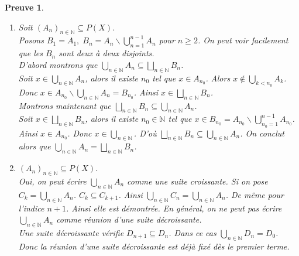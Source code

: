 \documentclass[a4paper, 12pt, french]{article}
\theoremstyle{break}
\newtheorem{preuve}{Preuve}[section]
\begin{document}
\begin{preuve}
      \begin{enumerate}
              \item Soit $(A_{n})_{n \in \mathbb{N}} \subseteq P(X)$.\\ Posons $ B_{1}= A_{1}, \; B_{n} = A_{n} \backslash \bigcup_{n=1}^{n-1} A_{n}$ pour $n \geq 2$. On peut voir facilement que les $B_{n}$ sont deux à deux disjoints.\\
              D'abord montrons que $\displaystyle\bigcup_{n \in \mathbb{N}} A_{n} \subseteq \bigsqcup_{n \in \mathbb{N}} B_{n}$.\\
              Soit $ x \in \displaystyle\bigcup_{n \in \mathbb{N}} A_{n}$, alors il existe $n_{0}$ tel que $x \in A_{n_{0}}$. Alors $x \not\in \displaystyle\bigcup_{k<n_{0}} A_{k}$. Donc $x \in A_{n_{0}} \backslash\displaystyle\bigcup_{n \in \mathbb{N}} A_{n} = B_{n_{0}}$.
              Ainsi $x \in \displaystyle\bigsqcup_{n \in \mathbb{N}} B_{n}$.\\
              Montrons maintenant que $\displaystyle\bigsqcup_{n \in \mathbb{N}} B_{n} \subseteq  \displaystyle\bigcup_{n \in \mathbb{N}} A_{n}$.\\
              Soit $x \in \bigsqcup_{n \in \mathbb{N}} B_{n}$, alors il existe $n_{0} \in \mathbb{N}$ tel que $x \in B_{n_{0}} = A_{n_{0}} \backslash \bigcup_{n_{0}=1}^{n-1}A_{n_{0}}$. Ainsi $x \in A_{n_{0}}$. Donc $x \in \bigcup_{n \in \mathbb{N}}$. D'où $\displaystyle\bigsqcup_{n \in \mathbb{N}} B_{n} \subseteq  \displaystyle\bigcup_{n \in \mathbb{N}} A_{n}$.
              On conclut alors que  $\displaystyle\bigcup_{n \in \mathbb{N}} A_{n} =  \bigsqcup_{n \in \mathbb{N}} B_{n}$.
              
              \item $(A_{n})_{n \in \mathbb{N}} \subseteq P(X)$.\\ Oui, on peut écrire  $\displaystyle\bigcup_{n \in \mathbb{N} } A_{n}$ comme une suite croissante.
              Si on pose $C_{k} = \displaystyle\bigcup_{n \in \mathbb{N}} A_{n}$. $C_{k} \subseteq C_{k+1}$. Ainsi $\displaystyle\bigcup_{n \in \mathbb{N}} C_{n} = \bigcup_{n \in \mathbb{N}} A_{n}$. De même pour l'indice $n+1$. Ainsi elle est démontrée.
              En général, on ne peut pas écrire $\displaystyle\bigcup_{n \in \mathbb{N}} A_{n}$ comme réunion d'une suite décroissante.\\ Une suite décroissante vérifie $D_{n+1} \subseteq D_{n}$. Dans ce cas $\displaystyle\bigcup_{n \in \mathbb{N}} D_{n} = D_{0}$. Donc la réunion d'une suite décroissante est déjà fixé dès le premier terme.
      \end{enumerate}
\end{preuve}
\end{document}
